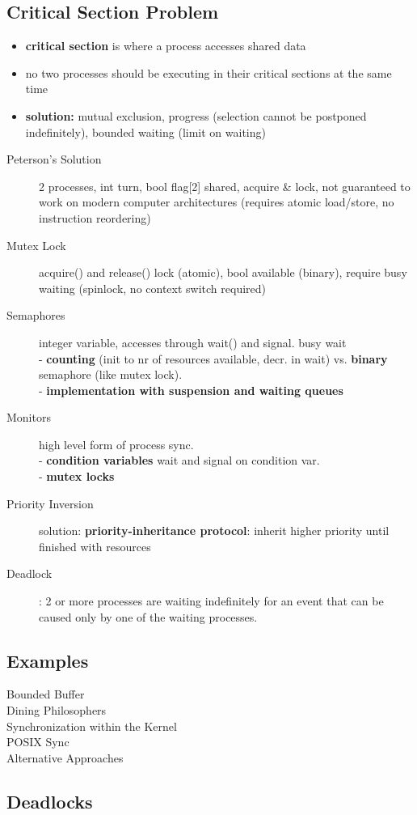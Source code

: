 \subsection*{Critical Section Problem}
\begin{itemize}
    \item \textbf{critical section} is where a process accesses shared data
    \item no two processes should be executing in their critical sections at the same time
    \item \textbf{solution:} mutual exclusion, progress (selection cannot be postponed indefinitely), bounded waiting (limit on waiting)
\end{itemize}
\begin{description}
    \item[Peterson's Solution] 2 processes, int turn, bool flag[2] shared, acquire \& lock, not guaranteed to work on modern computer architectures (requires atomic load/store, no instruction reordering)
    \item[Mutex Lock] acquire() and release() lock (atomic), bool available (binary), require busy waiting (spinlock, no context switch required)
    \item[Semaphores] integer variable, accesses through wait() and signal. busy wait \\
        - \textbf{counting} (init to nr of resources available, decr. in wait) vs. \textbf{binary} semaphore (like mutex lock). \\
        -  \textbf{implementation with suspension and waiting queues} %
    \item[Monitors] high level form of process sync. \\
        - \textbf{condition variables} wait and signal on condition var.   \\
        - \textbf{mutex locks}
    \item[Priority Inversion] solution: \textbf{priority-inheritance protocol}: inherit higher priority until finished with resources %
    \item[Deadlock]: 2 or more processes are waiting indefinitely for an event that can be caused only by one of the waiting processes.
\end{description}
\subsection*{Examples}
\begin{description}
    \item[Bounded Buffer]
    \item[Dining Philosophers]
    \item[Synchronization within the Kernel]
    \item[POSIX Sync]
    \item[Alternative Approaches]
\end{description}
\subsection*{Deadlocks}
